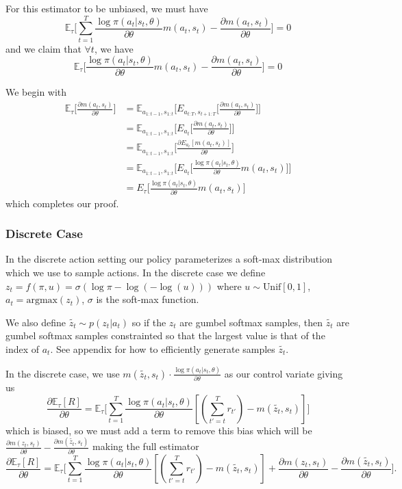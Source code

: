 \documentclass{article}
\newcommand{\E}{\mathbb{E}}
\newcommand{\LL}[1]{\frac{\log \pi(a_{#1}| s_{#1}, \theta)}{\partial \theta}}
\begin{document}
For this estimator to be unbiased, we must have $$\E_\tau\Big[\sum_{t=1}^T \LL{t} m(a_t, s_t) - \frac{\partial m(a_t, s_t)}{\partial\theta}\Big] = 0$$ and we claim that $\forall t$, we have $$\E_\tau\Big[\LL{t} m(a_t, s_t) - \frac{\partial m(a_t, s_t)}{\partial\theta}\Big] = 0$$

We begin with 
\begin{align}
\E_\tau\Big[\frac{\partial m(a_t, s_t)}{\partial\theta}\Big] &= \E_{a_{1:t-1},s_{1:t}}\Big[E_{a_{t:T},s_{t+1:T}}\Big[\frac{\partial m(a_t, s_t)}{\partial\theta}\Big]\Big]\\
&= \E_{a_{1:t-1},s_{1:t}}\Big[E_{a_t}\Big[\frac{\partial m(a_t, s_t)}{\partial\theta}\Big]\Big]\\
&=  \E_{a_{1:t-1},s_{1:t}}\Big[\frac{\partial{E_{a_t}[m(a_t, s_t)]}}{\partial \theta}\Big]\\
&= \E_{a_{1:t-1},s_{1:t}}\Big[E_{a_t}\Big[\LL{t} m(a_t, s_t)\Big]\Big]\\
&= E_\tau\Big[\LL{t} m(a_t, s_t)\Big]
\end{align}
which completes our proof.

\subsubsection{Discrete Case}
In the discrete action setting our policy parameterizes a soft-max distribution which we use to sample actions. 
In the discrete case we define $z_t = f(\pi, u) = \sigma (\log\pi - \log(-\log(u)))$ where $u\sim \text{Unif}[0, 1]$, $a_t = \text{argmax}(z_t)$, $\sigma$ is the soft-max function.

We also define $\tilde{z_t} \sim p(z_t|a_t)$ so if the $z_t$ are gumbel softmax samples, then $\tilde{z_t}$ are gumbel softmax samples constrainted so that the largest value is that of the index of $a_t$. See appendix for how to efficiently generate samples $\tilde{z_t}$. 

In the discrete case, we use $m(\tilde{z_t}, s_t)\cdot \LL{t}$ as our control variate giving us $$\frac{\partial \E_\tau[R]}{\partial \theta} = \E_\tau\Big[\sum_{t=1}^T \LL{t} [(\sum_{t'=t}^T r_{t'}) - m(\tilde{z_t}, s_t)]\Big]$$ which is biased, so we must add a term to remove this bias which will be $\frac{\partial m(z_t, s_t)}{\partial\theta} - \frac{\partial m(\tilde{z_t}, s_t)}{\partial\theta}$ making the full estimator
$$\frac{\partial \E_\tau[R]}{\partial \theta} = \E_\tau\Big[\sum_{t=1}^T \LL{t} [(\sum_{t'=t}^T r_{t'}) - m(\tilde{z_t}, s_t)] + \frac{\partial m(z_t, s_t)}{\partial\theta} -  \frac{\partial m(\tilde{z_t}, s_t)}{\partial\theta}\Big].$$ 
\end{document}
